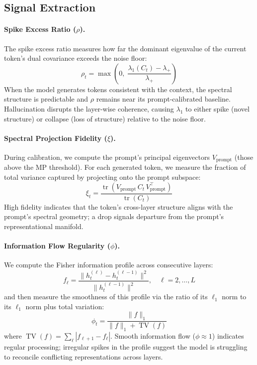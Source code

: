 \documentclass{article}
\begin{document}
\subsection{Signal Extraction}
\label{sec:signals}

\paragraph{Spike Excess Ratio ($\rho$).}
The spike excess ratio measures how far the dominant eigenvalue of the current token's dual covariance exceeds the noise floor:
\begin{equation}
    \rho_t = \max\!\left(0,\; \frac{\lambda_1(C_t) - \lambda_+}{\lambda_+}\right)
    \label{eq:rho}
\end{equation}
When the model generates tokens consistent with the context, the spectral structure is predictable and $\rho$ remains near its prompt-calibrated baseline. Hallucination disrupts the layer-wise coherence, causing $\lambda_1$ to either spike (novel structure) or collapse (loss of structure) relative to the noise floor.

\paragraph{Spectral Projection Fidelity ($\xi$).}
During calibration, we compute the prompt's principal eigenvectors $V_{\text{prompt}}$ (those above the MP threshold). For each generated token, we measure the fraction of total variance captured by projecting onto the prompt subspace:
\begin{equation}
    \xi_t = \frac{\operatorname{tr}(V_{\text{prompt}}\, C_t\, V_{\text{prompt}}^\top)}{\operatorname{tr}(C_t)}
    \label{eq:spf}
\end{equation}
High fidelity indicates that the token's cross-layer structure aligns with the prompt's spectral geometry; a drop signals departure from the prompt's representational manifold.

\paragraph{Information Flow Regularity ($\phi$).}
We compute the Fisher information profile across consecutive layers:
\begin{equation}
    f_\ell = \frac{\|h_t^{(\ell)} - h_t^{(\ell-1)}\|^2}{\|h_t^{(\ell-1)}\|^2}, \quad \ell = 2, \ldots, L
    \label{eq:fi-profile}
\end{equation}
and then measure the smoothness of this profile via the ratio of its $\ell_1$ norm to its $\ell_1$ norm plus total variation:
\begin{equation}
    \phi_t = \frac{\|f\|_1}{\|f\|_1 + \operatorname{TV}(f)}
    \label{eq:phi}
\end{equation}
where $\operatorname{TV}(f) = \sum_\ell |f_{\ell+1} - f_\ell|$. Smooth information flow ($\phi \approx 1$) indicates regular processing; irregular spikes in the profile suggest the model is struggling to reconcile conflicting representations across layers.
\end{document}
